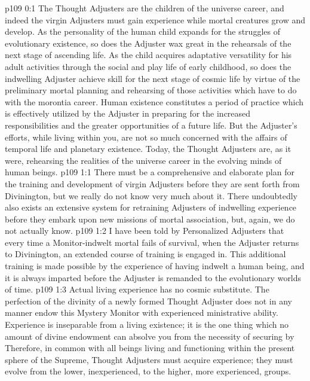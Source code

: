 \author{Solitary Messenger}
\vs p109 0:1 The Thought Adjusters are the children of the universe career, and indeed the virgin Adjusters must gain experience while mortal creatures grow and develop. As the personality of the human child expands for the struggles of evolutionary existence, so does the Adjuster wax great in the rehearsals of the next stage of ascending life. As the child acquires adaptative versatility for his adult activities through the social and play life of early childhood, so does the indwelling Adjuster achieve skill for the next stage of cosmic life by virtue of the preliminary mortal planning and rehearsing of those activities which have to do with the morontia career. Human existence constitutes a period of practice which is effectively utilized by the Adjuster in preparing for the increased responsibilities and the greater opportunities of a future life. But the Adjuster’s efforts, while living within you, are not so much concerned with the affairs of temporal life and planetary existence. Today, the Thought Adjusters are, as it were, rehearsing the realities of the universe career in the evolving minds of human beings.\plusone
{}
\vs p109 1:1 There must be a comprehensive and elaborate plan for the training and development of virgin Adjusters before they are sent forth from Divinington, but we really do not know very much about it. There undoubtedly also exists an extensive system for retraining Adjusters of indwelling experience before they embark upon new missions of mortal association, but, again, we do not actually know.\plusone
\vs p109 1:2 I have been told by Personalized Adjusters that every time a Monitor\hyp{}indwelt mortal fails of survival, when the Adjuster returns to Divinington, an extended course of training is engaged in. This additional training is made possible by the experience of having indwelt a human being, and it is always imparted before the Adjuster is remanded to the evolutionary worlds of time.
\vs p109 1:3 Actual living experience has no cosmic substitute. The perfection of the divinity of a newly formed Thought Adjuster does not in any manner endow this Mystery Monitor with experienced ministrative ability. Experience is inseparable from a living existence; it is the one thing which no amount of divine endowment can absolve you from the necessity of securing by  Therefore, in common with all beings living and functioning within the present sphere of the Supreme, Thought Adjusters must acquire experience; they must evolve from the lower, inexperienced, to the higher, more experienced, groups.
